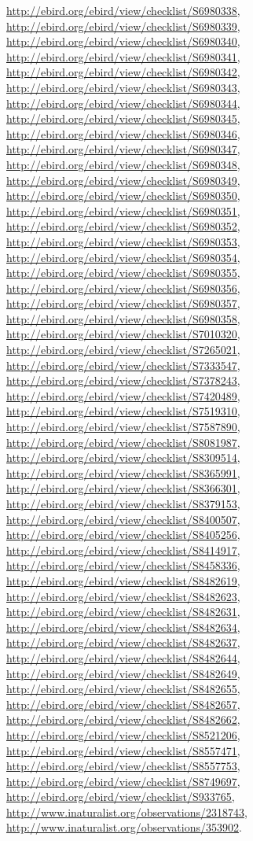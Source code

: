\documentclass[9pt, article]{memoir}
\begin{document}
\begin{multicols}{2}
\url{http://ebird.org/ebird/view/checklist/S6980338}, 
\url{http://ebird.org/ebird/view/checklist/S6980339}, 
\url{http://ebird.org/ebird/view/checklist/S6980340}, 
\url{http://ebird.org/ebird/view/checklist/S6980341}, 
\url{http://ebird.org/ebird/view/checklist/S6980342}, 
\url{http://ebird.org/ebird/view/checklist/S6980343}, 
\url{http://ebird.org/ebird/view/checklist/S6980344}, 
\url{http://ebird.org/ebird/view/checklist/S6980345}, 
\url{http://ebird.org/ebird/view/checklist/S6980346}, 
\url{http://ebird.org/ebird/view/checklist/S6980347}, 
\url{http://ebird.org/ebird/view/checklist/S6980348}, 
\url{http://ebird.org/ebird/view/checklist/S6980349}, 
\url{http://ebird.org/ebird/view/checklist/S6980350}, 
\url{http://ebird.org/ebird/view/checklist/S6980351}, 
\url{http://ebird.org/ebird/view/checklist/S6980352}, 
\url{http://ebird.org/ebird/view/checklist/S6980353}, 
\url{http://ebird.org/ebird/view/checklist/S6980354}, 
\url{http://ebird.org/ebird/view/checklist/S6980355}, 
\url{http://ebird.org/ebird/view/checklist/S6980356}, 
\url{http://ebird.org/ebird/view/checklist/S6980357}, 
\url{http://ebird.org/ebird/view/checklist/S6980358}, 
\url{http://ebird.org/ebird/view/checklist/S7010320}, 
\url{http://ebird.org/ebird/view/checklist/S7265021}, 
\url{http://ebird.org/ebird/view/checklist/S7333547}, 
\url{http://ebird.org/ebird/view/checklist/S7378243}, 
\url{http://ebird.org/ebird/view/checklist/S7420489}, 
\url{http://ebird.org/ebird/view/checklist/S7519310}, 
\url{http://ebird.org/ebird/view/checklist/S7587890}, 
\url{http://ebird.org/ebird/view/checklist/S8081987}, 
\url{http://ebird.org/ebird/view/checklist/S8309514}, 
\url{http://ebird.org/ebird/view/checklist/S8365991}, 
\url{http://ebird.org/ebird/view/checklist/S8366301}, 
\url{http://ebird.org/ebird/view/checklist/S8379153}, 
\url{http://ebird.org/ebird/view/checklist/S8400507}, 
\url{http://ebird.org/ebird/view/checklist/S8405256}, 
\url{http://ebird.org/ebird/view/checklist/S8414917}, 
\url{http://ebird.org/ebird/view/checklist/S8458336}, 
\url{http://ebird.org/ebird/view/checklist/S8482619}, 
\url{http://ebird.org/ebird/view/checklist/S8482623}, 
\url{http://ebird.org/ebird/view/checklist/S8482631}, 
\url{http://ebird.org/ebird/view/checklist/S8482634}, 
\url{http://ebird.org/ebird/view/checklist/S8482637}, 
\url{http://ebird.org/ebird/view/checklist/S8482644}, 
\url{http://ebird.org/ebird/view/checklist/S8482649}, 
\url{http://ebird.org/ebird/view/checklist/S8482655}, 
\url{http://ebird.org/ebird/view/checklist/S8482657}, 
\url{http://ebird.org/ebird/view/checklist/S8482662}, 
\url{http://ebird.org/ebird/view/checklist/S8521206}, 
\url{http://ebird.org/ebird/view/checklist/S8557471}, 
\url{http://ebird.org/ebird/view/checklist/S8557753}, 
\url{http://ebird.org/ebird/view/checklist/S8749697}, 
\url{http://ebird.org/ebird/view/checklist/S933765}, 
\url{http://www.inaturalist.org/observations/2318743}, 
\url{http://www.inaturalist.org/observations/353902}.


\end{multicols}
\end{document}
